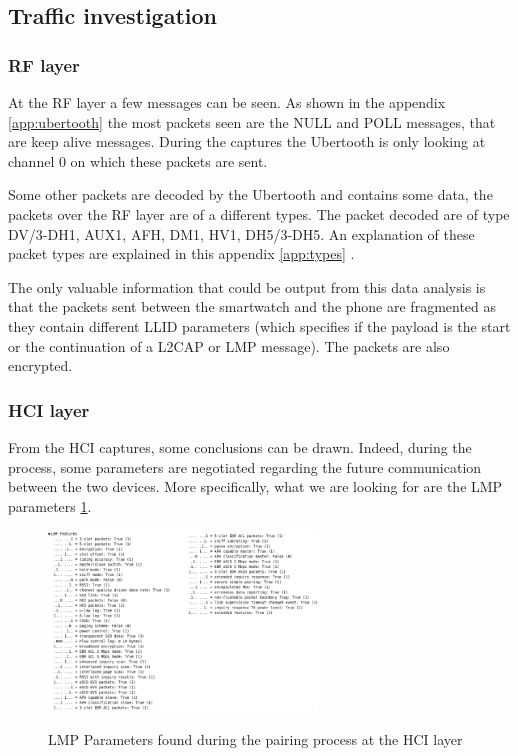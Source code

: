 \subsection{Traffic investigation}
\subsubsection{RF layer}
At the RF layer a few messages can be seen. As shown in the appendix \ref{app:ubertooth} the most packets seen are the NULL and POLL messages, that are keep alive messages. During the captures the Ubertooth is only looking at channel 0 on which these packets are sent.

Some other packets are decoded by the Ubertooth and contains some data, the packets over the RF layer are of a different types. The packet decoded are of type DV/3-DH1, AUX1, AFH, DM1, HV1, DH5/3-DH5. An explanation of these packet types are explained in this appendix \ref{app:types} .

The only valuable information that could be output from this data analysis is that the packets sent between the smartwatch and the phone are fragmented as they contain different LLID parameters (which specifies if the payload is the start or the continuation of a L2CAP or LMP message). The packets are also encrypted.

\subsubsection{HCI layer}
From the HCI captures, some conclusions can be drawn. Indeed, during the process, some parameters are negotiated regarding the future communication between the two devices. More specifically, what we are looking for are the LMP parameters \ref{fig:lmp}. 
\begin{figure}[!h]
  \begin{center}
	\includegraphics[width=270px]{images/LMP_PARAM.jpg}
	\label{fig:lmp}
	\caption{LMP Parameters found during the pairing process at the HCI layer}
  \end{center}
\end{figure}

